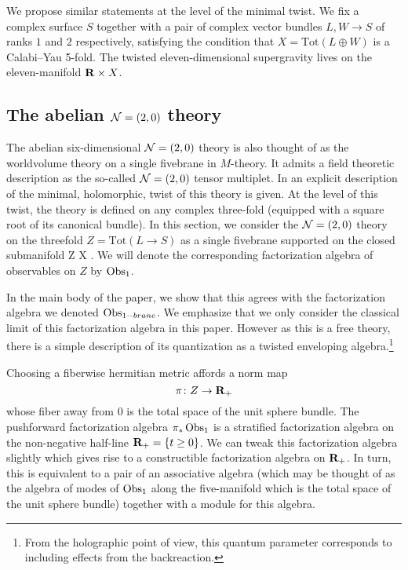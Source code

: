 We propose similar statements at the level of the minimal twist. 
We fix a complex surface $S$ together with a pair of complex vector bundles $L,W \to S$ of ranks $1$ and $2$ respectively, satisfying the condition that $X = \text{Tot} (L \oplus W)$ is a Calabi--Yau 5-fold.
The twisted eleven-dimensional supergravity lives on the eleven-manifold $\mathbf{R} \times X$. 

\subsection*{The abelian $\mathcal N=(2,0)$ theory}

The abelian six-dimensional $\mathcal N=(2,0)$ theory is also thought of as the worldvolume theory on a single fivebrane in $M$-theory. 
It admits a field theoretic description as the so-called $\mathcal N=(2,0)$ tensor multiplet. 
In \cite{SWtensor} an explicit description of the minimal, holomorphic, twist of this theory is given.
At the level of this twist, the theory is defined on any complex three-fold (equipped with a square root of its canonical bundle). 
In this section, we consider the $\mathcal N=(2,0)$ theory on the threefold $Z = \text{Tot}(L \to S)$ as a single fivebrane supported on the closed submanifold
\beqn
Z \hookrightarrow \R \times X .
\eeqn
We will denote the corresponding factorization algebra of observables on $Z$ by $\operatorname{Obs}_1$.

In the main body of the paper, we show that this agrees with the factorization algebra we denoted $\operatorname{Obs}_{1-brane}$. We emphasize that we only consider the classical limit of this factorization algebra in this paper. However as this is a free theory, there is a simple description of its quantization as a twisted enveloping algebra.\footnote{From the holographic point of view, this quantum parameter corresponds to including effects from the backreaction.}

Choosing a fiberwise hermitian metric affords a norm map 
\[
\pi \colon Z \to \mathbf{R}_{+}
\] 
whose fiber away from $0$ is the total space of the unit sphere bundle.
The pushforward factorization algebra $\pi_{*}\operatorname{Obs}_{1}$ is a stratified factorization algebra on the non-negative half-line $\mathbf{R}_+ = \{t \geq 0\}$. 
We can tweak this factorization algebra slightly which gives rise to a constructible factorization algebra on $\mathbf{R}_+$.
In turn, this is equivalent to a pair of an associative algebra (which may be thought of as the algebra of modes of $\operatorname{Obs}_{1}$ along the five-manifold which is the total space of the unit sphere bundle) together with a module for this algebra.

